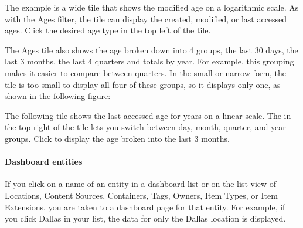 \documentclass[letterpaper,10pt,english]{sphinxmanual}
\begin{document}
The example is a wide tile that shows the modified age on a logarithmic scale.  As with the Ages filter, the tile can display the created, modified, or last accessed ages. Click the desired age type in the top left of the tile.

The Ages tile also shows the age broken down into 4 groups, the last 30 days, the last 3 months, the last 4 quarters and totals by year.  For example, this grouping makes it easier to compare between quarters. In the  small or narrow form, the tile is too small to display all four of these groups, so it displays only one, as shown in the following figure:
\begin{quote}

\begin{figure}[htbp]
\centering

\noindent{}
\end{figure}
\end{quote}

The following tile shows the last-accessed age for years on a linear scale.  The  in the top-right of the tile lets you switch between day, month, quarter, and year groups.   Click  to display the age broken into the last 3 months.
\begin{quote}

\begin{figure}[htbp]
\centering

\noindent{}
\end{figure}
\end{quote}


\paragraph{Dashboard entities}
\label{\detokenize{mcdmp_app_ug:dashboard-entities}}
If you click on a name of an entity in a dashboard list or on the list view of Locations, Content Sources, Containers, Tags, Owners, Item Types, or Item Extensions, you are taken to a dashboard page for that entity.
For example, if you click Dallas in your  list, the data for only the Dallas location is displayed.
\begin{quote}

\begin{figure}[htbp]
\centering

\noindent{}
\end{figure}
\end{quote}
\end{document}
